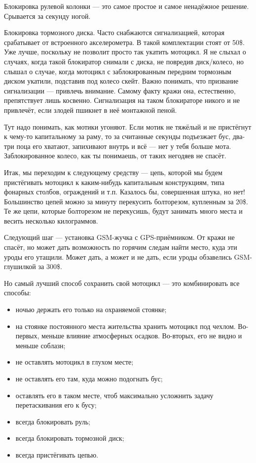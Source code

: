 \documentclass[12pt,a4paper]{article}
\begin{document}
Блокировка рулевой колонки --- это самое простое и самое ненадёжное
решение. Срывается за секунду ногой.

Блокировка тормозного диска. Часто снабжаются сигнализацией, которая
срабатывает от встроенного акселерометра. В такой комплектации стоят
от 50\$. Уже лучше, поскольку не позволит просто так укатить мотоцикл.
Я не слыхал о случаях, когда такой блокиратор снимали с диска, не
повредив диск/колесо, но слышал о случае, когда мотоцикл с заблокированным
передним тормозным диском укатили, подставив под колесо скейт.
Важно понимать, что призвание сигнализации --- привлечь внимание.
Самому факту кражи она, естественно, препятствует лишь косвенно.
Сигнализация на таком блокираторе никого и не привлечёт, если злодей
пшикнет в неё монтажной пеной.

Тут надо понимать, как
мотики угоняют. Если мотик не тяжёлый и не пристёгнут к чему-то
капитальному за раму, то за считанные секунды подъезжает бус, два-три
поца его хватают, запихивают внутрь и всё --- нет у тебя больше мота.
Заблокированное колесо, как ты понимаешь, от таких негодяев не спасёт.

Итак, мы переходим к следующему средству --- цепь, которой мы будем
пристёгивать мотоцикл к каким-нибудь капитальным конструкциям, типа
фонарных столбов, ограждений и т.п. Казалось бы, совершенная штука,
но нет! Большинство цепей можно за минуту перекусить болторезом,
купленным за 20\$. Те же цепи, которые болторезом не перекусишь, будут
занимать много места и весить несколько килограммов.

Следующий шаг --- установка GSM-жучка с GPS-приёмником. От кражи не
спасёт, но может дать возможность по горячим следам найти место,
куда эти уроды его утащили. Может дать, а может и не дать, если уроды
обзавелись GSM-глушилкой за 300\$.

Но самый лучший способ сохранить свой мотоцикл --- это комбинировать все
способы:

\begin{itemize}
\item ночью держать его только на охраняемой стоянке;
\item на стоянке постоянного места жительства хранить мотоцикл под чехлом.
Во-первых, меньше влияние атмосферных осадков. Во-вторых, его не видно и
меньше соблазн;
\item не оставлять мотоцикл в глухом месте;
\item не оставлять его там, куда можно подогнать бус;
\item оставлять его в таком месте, чтоб максимально усложнить задачу
перетаскивания его к бусу;
\item всегда блокировать руль;
\item всегда блокировать тормозной диск;
\item всегда пристёгивать цепью.
\end{itemize}
\end{document}
